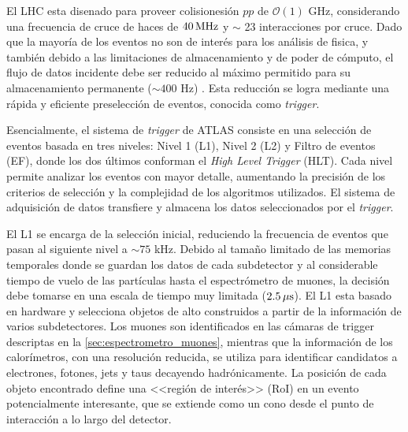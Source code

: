 El LHC esta disenado para proveer colisionesión $pp$ de $\mathcal{O}(1)$ GHz,
considerando una frecuencia de cruce de haces de $\unit[40]{MHz}$ y $\sim$ 23
interacciones por cruce. Dado que la mayoría de los eventos no son de interés
para los análisis de fisica, y también debido a las limitaciones de
almacenamiento y de poder de cómputo, el flujo de datos incidente debe ser
reducido al máximo permitido para su almacenamiento permanente ($\sim 400$ Hz)
\cite{Aad:2012xs}.
Esta reducción se logra mediante una rápida y eficiente preselección de eventos,
conocida como \emph{trigger}.

Esencialmente, el sistema de \emph{trigger} de ATLAS \cite{atlas} consiste en
una selección de eventos basada en tres niveles: Nivel 1 (L1), Nivel 2 (L2) y
Filtro de eventos (EF), donde los dos últimos conforman el \emph{High Level
  Trigger} (HLT). Cada nivel permite analizar los eventos con mayor detalle,
aumentando la precisión de los criterios de selección y la complejidad de los
algoritmos utilizados. El sistema de adquisición de datos transfiere y
almacena los datos seleccionados por el \emph{trigger}.

El L1 se encarga de la selección inicial, reduciendo la frecuencia de eventos
que pasan al siguiente nivel a $\sim 75$ kHz. Debido al tamaño limitado de las
memorias temporales donde se guardan los datos de cada subdetector y al
considerable tiempo de vuelo de las partículas hasta el espectrómetro de muones,
la decisión debe tomarse en una escala de tiempo muy limitada ($\unit[2.5]{\mu
  s}$). El L1 esta basado en hardware y selecciona objetos de alto {\pt}
construidos a partir de la información de varios subdetectores. Los muones son
identificados en las cámaras de trigger descriptas en la
\cref{sec:espectrometro_muones}, mientras que la información de los
calorímetros, con una resolución reducida, se utiliza para identificar
candidatos a electrones, fotones, jets y taus decayendo hadrónicamente. La
posición de cada objeto encontrado define una <<región de interés>> (RoI) en
un evento potencialmente interesante, que se extiende como un cono desde el
punto de interacción a lo largo del detector.

